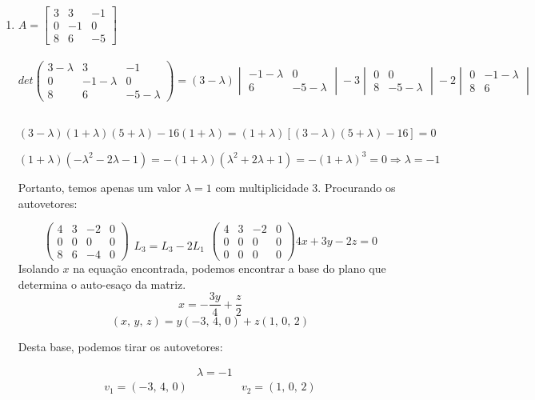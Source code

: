 \begin{enumerate}
	\item
	$A = 
	\begin{bmatrix}
		3 &  3 & -1 \\
		0 & -1 &  0 \\
		8 &  6 & -5
	\end{bmatrix}		
	$
	\\ \\
	\solucao
	$$det
	\begin{pmatrix}
		3 - \lambda &  3           & -1           \\
		0           & -1 - \lambda &  0           \\
		8           &  6           & -5 - \lambda 
	\end{pmatrix}
	= (3 - \lambda)
	\begin{vmatrix}
		-1 - \lambda & 0           \\
		 6           & -5 - \lambda
	\end{vmatrix}
	-3
	\begin{vmatrix}
		0 &  0           \\
		8 & -5 - \lambda
	\end{vmatrix}
	-2
	\begin{vmatrix}
		0 & -1 - \lambda \\
		8 &  6          
	\end{vmatrix}
	$$
	\\
	\begin{center}
		$
		(3 - \lambda)(1+\lambda)(5+\lambda) - 16(1+\lambda) =
		(1+\lambda)\left[(3-\lambda)(5+\lambda) - 16\right]=0		
		$
		
		$
		(1+\lambda)(-\lambda^2-2\lambda-1) =
		-(1+\lambda)(\lambda^2+2\lambda+1) = -(1+\lambda)^3 = 0 \Rightarrow \lambda = -1$
	\end{center}
	
	Portanto, temos apenas um valor $\lambda = 1$ com multiplicidade 3.
	Procurando os autovetores:
	
	$$
	\begin{pmatrix}
		4 & 3 & -2 & 0\\
		0 & 0 &  0 & 0\\
		8 & 6 & -4 & 0
	\end{pmatrix}
	\begin{array}{c}
		\\ \\ L_3 = L_3 - 2L_1
	\end{array}
	\begin{pmatrix}
		4 & 3 & -2 & 0\\
		0 & 0 &  0 & 0\\
		0 & 0 &  0 & 0
	\end{pmatrix}
	4x+3y-2z = 0
	$$
	Isolando $x$ na equação encontrada, podemos encontrar
	a base do plano que determina o auto-esaço da matriz.
	$$
	x = -\frac{3y}{4} + \frac{z}{2}	
	$$
	$$
	(x, \, y, \, z) = y(-3, \, 4, \, 0) + z(1, \, 0, \, 2)	
	$$
	
	Desta base, podemos tirar os autovetores:
	
	$$
	\begin{array}{ccc}
		& \lambda = -1 & \\
		v_1 = (-3, \, 4, \, 0) & & v_2 = (1, \, 0, \, 2)
	\end{array}		
	$$
	
	
\end{enumerate}